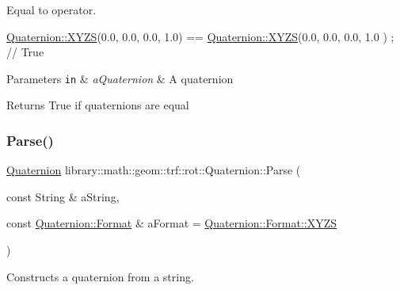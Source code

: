 Equal to operator. 


\begin{DoxyCode}
\hyperlink{classlibrary_1_1math_1_1geom_1_1trf_1_1rot_1_1_quaternion_afff9523c7dcbfbbc521736121e62ad41}{Quaternion::XYZS}(0.0, 0.0, 0.0, 1.0) == \hyperlink{classlibrary_1_1math_1_1geom_1_1trf_1_1rot_1_1_quaternion_afff9523c7dcbfbbc521736121e62ad41}{Quaternion::XYZS}(0.0, 0.0, 0.0, 1.0
      ) ; \textcolor{comment}{// True}
\end{DoxyCode}



\begin{DoxyParams}[1]{Parameters}
\mbox{\tt in}  & {\em a\+Quaternion} & A quaternion \\
\hline
\end{DoxyParams}
\begin{DoxyReturn}{Returns}
True if quaternions are equal 
\end{DoxyReturn}
\mbox{\label{classlibrary_1_1math_1_1geom_1_1trf_1_1rot_1_1_quaternion_a43b2579c18c59f5124e0b864218cbb7b}} 
\subsubsection{\texorpdfstring{Parse()}{Parse()}}
{\footnotesize\ttfamily \hyperlink{classlibrary_1_1math_1_1geom_1_1trf_1_1rot_1_1_quaternion}{Quaternion} library\+::math\+::geom\+::trf\+::rot\+::\+Quaternion\+::\+Parse (\begin{DoxyParamCaption}\item[{const String \&}]{a\+String,  }\item[{const \hyperlink{classlibrary_1_1math_1_1geom_1_1trf_1_1rot_1_1_quaternion_a2ca851b117657819310fe5a9b9e5d681}{Quaternion\+::\+Format} \&}]{a\+Format = {\ttfamily \hyperlink{classlibrary_1_1math_1_1geom_1_1trf_1_1rot_1_1_quaternion_a2ca851b117657819310fe5a9b9e5d681a11c51ecd5dc6f86ba3c1ae79e21482f5}{Quaternion\+::\+Format\+::\+X\+Y\+ZS}} }\end{DoxyParamCaption})\hspace{0.3cm}{\ttfamily [static]}}



Constructs a quaternion from a string. 



